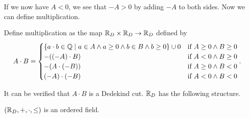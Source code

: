 \documentclass[../main.tex]{subfiles}
\begin{document}
If we now have $A<0$, we see that $-A>0$ by adding $-A$ to both sides. Now we can define multiplication.
\begin{definition}
    Define multiplication as the map $\mathbb{R}_D\times\mathbb{R}_D\to\mathbb{R}_D$ defined by
    \begin{equation*}
        A\cdot B=
        \begin{cases}
            \{a\cdot b\in\mathbb{Q}\mid a\in A\land a\geq0\land b\in B\land b\geq0\}\cup0 & \text{if }A\geq0\land B\geq0 \\
            -((-A)\cdot B) & \text{if }A<0\land B\geq0 \\
            -(A\cdot(-B)) & \text{if }A\geq0\land B<0 \\
            (-A)\cdot(-B) & \text{if }A<0\land B<0
        \end{cases}.
    \end{equation*}
\end{definition}
It can be verified that $A\cdot B$ is a Dedekind cut. $\mathbb{R}_D$ has the following structure.
\begin{proposition}\label{prp:the_real_numbers:dedekind_ordered_field_real_numbers}
    $(\mathbb{R}_D,+,\cdot,\leq)$ is an ordered field.
\end{proposition}
\end{document}
